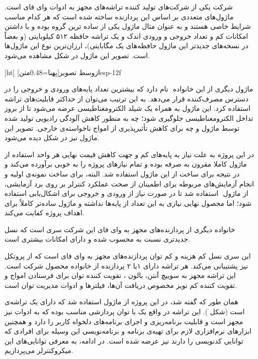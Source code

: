 شرکت  یکی از شرکت‌های تولید کننده تراشه‌های مجهز به ادوات وای فای است. ماژول‌های متعددی بر اساس این پردازنده ساخته شده است که هر کدام مناسب شرایط خاصی هستند و به عنوان مثال ماژول  یکی از ساده ترین گروه بوده و با داشتن امکانات کم و تعداد خروجی و ورودی اندک و یک تراشه حافظه ۵۱۲ کیلوبایتی (و بعضاً در نسخه‌های جدیدتر این ماژول حافظه‌های یک مگابایتی)، ارزان‌ترین نوع این ماژول‌ها است. تصویر این ماژول در شکل  مشاهده می‌شود.

[ht]
‌ازوسط
‌تصویر[پهنا=0.48‌متن]{esp-12f}

ماژول دیگری از این خانواده ‌ نام دارد که بیشترین تعداد پایه‌های ورودی و خروجی را در دسترس مصرف‌کننده قرار می‌دهد. به این ترتیب می‌توان از حداکثر قابلیت‌های تراشه استفاده کرد. این ماژول به همراه یک شیلد الکترومغناطیسی عرضه می‌شود تا از بروز تداخل الکترومغناطیسی جلوگیری شود؛ چه به منظور کاهش آلودگی رادیویی تولید شده توسط ماژول و چه برای کاهش تأثیرپذیری از امواج ناخواسته‌ی خارجی. تصویر این ماژول نیز در شکل  دیده می‌شود.

در این پروژه به علت نیاز به پایه‌های کم و جهت کاهش قیمت نهایی هر واحد استفاده از ماژول  کاملا مقرون به صرفه بوده و تمام نیازهای پروژه را به خوبی برآورده می‌کند و در نتیجه برای ساخت از این ماژول استفاده شد. البته، برای ساخت نمونه‌ی اولیه و انجام آزمایش‌های مربوطه برای اطمینان از صحت عملکرد کنترلر بر روی برد آزمایشی، از ماژول ‌ استفاده شد تا در صورت نیاز از ورودی و خروجی برای اشکال‌یابی استفاده شود؛ اما محصول نهایی نیازی به این تعداد از پایه‌ها نداشته و ماژول ساده‌تر کاملاً برای اهداف پروژه کفایت می‌کند.


خانواده دیگری از پردازنده‌های مجهز به وای فای این شرکت سری  است که نسل جدیدتری نسبت به  محسوب شده و دارای امکانات بیشتری است.

این سری نسل کم هزینه و کم توان پردازنده‌های مجهز به وای فای است که از پروتکل نیز پشتیبانی می‌کند. هر تراشه دارای ۱یا ۲ پردازنده از خانواده  محصول شرکت  است. این تراشه مجهز به سوییچ آنتن، بالون ، تقویت کننده توان برای فرستادن امواج و تقویت کننده کم نویز مخصوص دریافت آن‌ها، فیلترها و ادوات مدیریت توان است.


همان طور که گفته شد، در این پروژه از ماژول  استفاده شد که دارای یک تراشه‌ی  است (شکل ). این تراشه در واقع یک  با توان پردازشی مناسب بوده که به ادوات  نیز مجهز است و قابلیت برنامه‌ریزی و اجرای برنامه‌های دلخواه کاربر را دارد و همچنین ابزارهای نرم‌افزاری لازم برای تهیه‌ی برنامه و برنامه‌نویسی این وسیله برای افرادی که توانایی کدنویسی را دارند نیز عرضه شده است. در ادامه، به معرفی توانایی‌های این میکروکنترلر می‌پردازیم.

